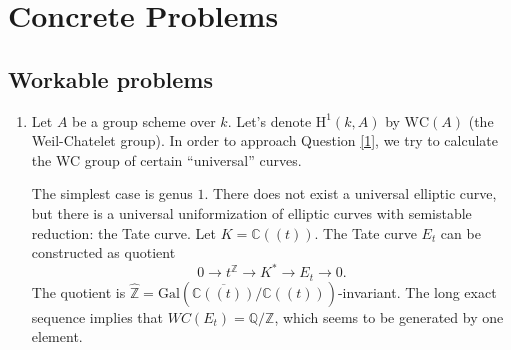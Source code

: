 \documentclass[8pt]{amsart}
\begin{document}
%

\section{Concrete Problems}
\subsection{Workable problems}
\begin{enumerate}
\item
 Let $A$ be a group scheme over $k$. Let's denote $\mathrm{H}^1(k,A)$ by $\mathrm{WC}(A)$ (the Weil-Chatelet group). In order to approach Question \ref{1}, we try to calculate the WC group of certain ``universal'' curves.

    The simplest case is genus $1$. There does not exist a universal elliptic curve, but there is a universal uniformization of elliptic curves with semistable reduction: the Tate curve. Let $K=\mathbb{C}((t))$. The Tate curve $E_t$ can be constructed as quotient $$0\to t^\mathbb{Z}\to K^*\to E_t\to 0.$$ The quotient is $\widehat{\mathbb{Z}}=\mathrm{Gal}(\overline{\mathbb{C}((t))}/\mathbb{C}((t)))$-invariant. The long exact sequence implies that $WC(E_t)=\mathbb{Q}/\mathbb{Z}$, which seems to be generated by one element.


\end{enumerate}
\end{document}
